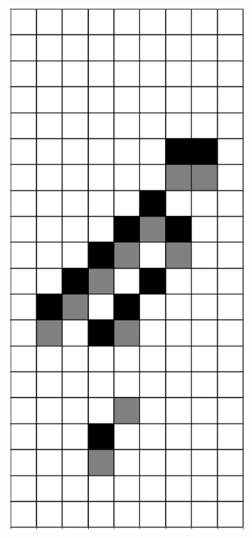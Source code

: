 \documentclass[12pt]{article}
\numberwithin{figure}{section} %
\begin{document}
\begin{figure}[H]
\begin{subfigure}{0.3\textwidth}
     \subcaption{}
   \end{subfigure}
     \begin{subfigure}{0.3\textwidth}
     \centering
     \includegraphics[angle=270,width=\linewidth]{Section4/22.4}

\end{subfigure}
\end{figure}
\end{document}
